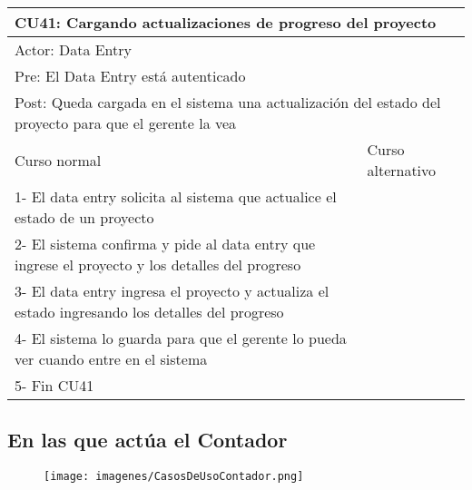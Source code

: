 \begin{table}[H]
  \begin{adjustbox}{max width = \textwidth}
  \begin{tabular}{|l|l|}
    \hline
    \multicolumn{2}{|l|}{CU41: Cargando actualizaciones de progreso del proyecto
} \\\hline
    \multicolumn{2}{|l|}{Actor: Data Entry} \\\hline
    \multicolumn{2}{|l|}{Pre: El Data Entry está autenticado} \\\hline
    \multicolumn{2}{|l|}{Post: Queda cargada en el sistema una actualización del estado del proyecto para que el gerente la vea} \\\hline
     Curso normal & Curso alternativo\\ \hline
     1- El data entry solicita al sistema que actualice el estado de un proyecto & \\ \hline
     2- El sistema confirma y pide al data entry que ingrese el proyecto y los detalles del progreso & \\ \hline
	 3- El data entry ingresa el proyecto y actualiza el estado ingresando los detalles del progreso & \\ \hline
   4- El sistema lo guarda para que el gerente lo pueda ver cuando entre en el sistema & \\ \hline
   5- Fin CU41 & \\ \hline
  \end{tabular}
  \end{adjustbox}
\end{table}


\subsection{En las que actúa el Contador}

\begin{figure}[H]
    \texttt{[image: imagenes/CasosDeUsoContador.png]}
\end{figure}

